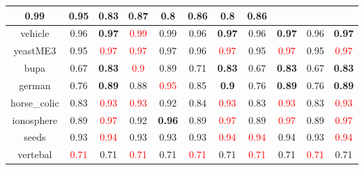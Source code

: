 \documentclass{article}%
\begin{document}
\begin{tabular}{c|cccccccccc}
{0.99
}&0.95&0.83&\textbf{0.87}&0.8&\textbf{0.86}&0.8&\textbf{0.86}\\%
\hline%
vehicle&0.96&\textbf{0.97}&\textcolor{red}{ 
0.99
}&0.99&0.96&\textbf{0.97}&0.96&\textbf{0.97}&0.96&\textbf{0.97}\\%
\hline%
yeastME3&0.95&\textcolor{red}{ 
0.97
}&\textcolor{red}{ 
0.97
}&0.97&0.96&\textcolor{red}{ 
0.97
}&0.95&\textcolor{red}{ 
0.97
}&0.95&\textcolor{red}{ 
0.97
}\\%
\hline%
bupa&0.67&\textbf{0.83}&\textcolor{red}{ 
0.9
}&0.89&0.71&\textbf{0.83}&0.67&\textbf{0.83}&0.67&\textbf{0.83}\\%
\hline%
german&0.76&\textbf{0.89}&0.88&\textcolor{red}{ 
0.95
}&0.85&\textbf{0.9}&0.76&\textbf{0.89}&0.76&\textbf{0.89}\\%
\hline%
horse\_colic&0.83&\textcolor{red}{ 
0.93
}&\textcolor{red}{ 
0.93
}&0.92&0.84&\textcolor{red}{ 
0.93
}&0.83&\textcolor{red}{ 
0.93
}&0.83&\textcolor{red}{ 
0.93
}\\%
\hline%
ionosphere&0.89&\textcolor{red}{ 
0.97
}&0.92&\textbf{0.96}&0.89&\textcolor{red}{ 
0.97
}&0.89&\textcolor{red}{ 
0.97
}&0.89&\textcolor{red}{ 
0.97
}\\%
\hline%
seeds&0.93&\textcolor{red}{ 
0.94
}&0.93&0.93&0.93&\textcolor{red}{ 
0.94
}&\textcolor{red}{ 
0.94
}&0.94&0.93&\textcolor{red}{ 
0.94
}\\%
\hline%
vertebal&\textcolor{red}{ 
0.71
}&0.71&\textcolor{red}{ 
0.71
}&0.71&\textcolor{red}{ 
0.71
}&0.71&\textcolor{red}{ 
0.71
}&0.71&\textcolor{red}{ 
0.71
}&0.71\\%
\hline%
\end{tabular}

%
\end{document}
